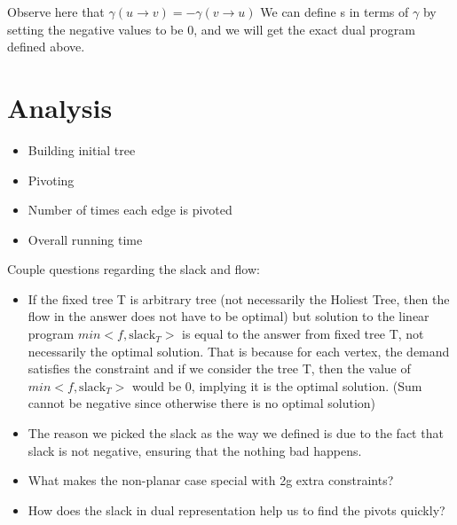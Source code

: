 \documentclass{article}
\begin{document}
Observe here that $\gamma (u \rightarrow v) = - \gamma (v \rightarrow u)$
We can define s in terms of $\gamma $ by setting the negative values to be 0, and we will get the exact dual program defined above.

\section{Analysis}
\begin{itemize}
\item Building initial tree
\item Pivoting
\item Number of times each edge is pivoted
\item Overall running time
\end{itemize}

Couple questions regarding the slack and flow:
\begin{itemize}
\item If the fixed tree T is arbitrary tree (not necessarily the Holiest Tree, then the flow in the answer does not have to be optimal) but solution to the linear program $min <f, \text{slack}_T>$ is equal to the answer from fixed tree T, not necessarily the optimal solution. That is because for each vertex, the demand satisfies the constraint and if we consider the tree T, then the value of $min <f, \text{slack}_T>$ would be 0, implying it is the optimal solution. (Sum cannot be negative since otherwise there is no optimal solution)
\item The reason we picked the slack as the way we defined is due to the fact that slack is not negative, ensuring that the nothing bad happens.
\item What makes the non-planar case special with 2g extra constraints?
\item How does the slack in dual representation help us to find the pivots quickly?
\end{itemize}
\end{document}
